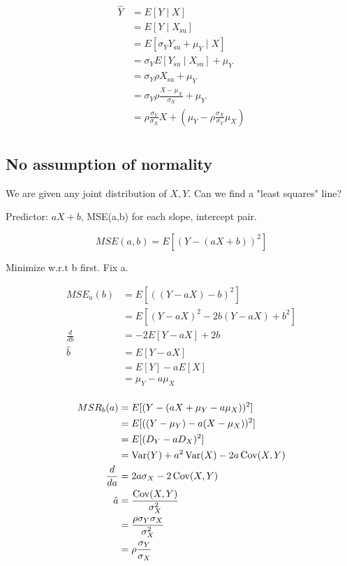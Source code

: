 \documentclass{report}
\begin{document}
\begin{align*}
	\hat Y &= E[Y  \mid X] \\
	&= E[Y \mid X_{\text{su}}] \\
	&= E[\sigma_{Y} Y_{\text{su}} + \mu_{Y} \mid X]  \\
	&= \sigma_{Y}E[Y_{\text{su}} \mid X _{\text{su}}] + \mu _{Y} \\
	&= \sigma_{Y} \rho X_{\text{su}} + \mu _{Y} \\
	&= \sigma_{Y} \rho \frac{X- \mu _{X}}{\sigma_{X}} + \mu_{Y} \\
	&= \rho \frac{\sigma_{Y}}{\sigma_{X}} X + \left( \mu _{Y} - \rho \frac{\sigma_{X}}{\sigma_{Y}} \mu _{X} \right)  \\
\end{align*}



\subsection{No assumption of normality}

We are given any joint distribution of $X, Y$. Can we find a "least squares" line? 


Predictor: $aX + b$, MSE(a,b) for each slope, intercept pair. 


\[
MSE(a,b) = E[\left( Y- (aX + b) \right) ^{2}]
\]

Minimize w.r.t b first. Fix a. 


\begin{align*}
	MSE_{a}(b) &= E[ \left( (Y - aX) -b \right)^{2} ] \\
	&= E[ (Y -aX) ^{2} - 2b(Y-aX) + b^{2} ] \\
	\frac{d}{db} &=  -2E[Y -aX] + 2b  \\
	\hat b &= E[Y-aX] \\
	&= E[Y] - aE[X] \\
	&= \mu _{Y} - a \mu _{X} \\
\end{align*}

\begin{align*}
	MSR_{b}(a) &= E[ (Y- (aX + \mu _{Y} - a\mu _{X}))^{2} ] \\
	&= E[ (( Y - \mu _{Y}) - a(X-\mu _{X}))^{2}] \\
	&= E[( D_{Y} - aD_{X})^{2}] \\
	&= \operatorname{Var}(Y) + a^{2}\operatorname{Var}(X) - 2a \operatorname{Cov}(X,Y) \\
\frac{d}{da}	&= 2a \sigma_{X} -2 \operatorname{Cov}(X,Y) \\
\hat a &= \frac{\operatorname{Cov}(X,Y)}{\sigma_{X}^{2}} \\
&= \frac{\rho \sigma_{Y} \sigma_{X}}{\sigma_{X}^{2}} \\
&= \rho \frac{\sigma_{Y}}{\sigma_{X}} \\
\end{align*}
\end{document}

